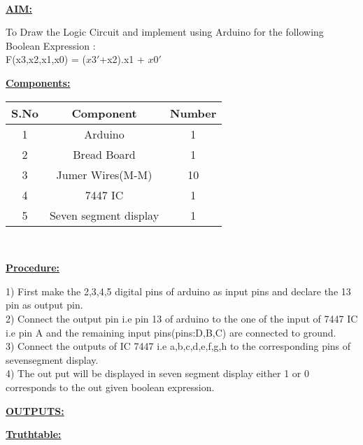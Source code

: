 \documentclass[10pt,a4paper,twocolumn]{report}
\begin{document}
\vspace{5mm}
\\ \raggedright \textbf{\underline{AIM:}}\vspace{2mm}
\\ \raggedright To Draw the Logic Circuit and implement using Arduino for the following Boolean Expression :
\\ F(x3,x2,x1,x0) = ($x3'$+x2).x1 + $x0'$
\vspace{5mm}
\\ \raggedright \textbf{\underline{Components:}}\vspace{2mm}
\begin{table}[ht]
\centering %
\begin{tabular}{c c c} %
\hline\hline %
S.No & Component & Number \\ [0.5ex] %
\hline
1 & Arduino & 1 \\
2 & Bread Board & 1 \\
3 & Jumer Wires(M-M) & 10 \\
4 & 7447 IC & 1 \\
5 & Seven segment display & 1 \\ [1ex] 
\hline
\end{tabular}
\end{table}
\vspace{5mm}
\\ \raggedright \textbf{\underline{Procedure:}}\vspace{4mm}
\\ \raggedright 1) First make the 2,3,4,5 digital pins of arduino as input pins and declare                            the 13 pin as output pin.
\\ 2) Connect the output pin i.e pin 13 of arduino to the one of the input of 7447 IC i.e pin A and the remaining input pins(pins:D,B,C) are connected to ground.
\\ 3) Connect the outputs of IC 7447 i.e a,b,c,d,e,f,g,h to the corresponding pins of sevensegment display.
\\ 4) The out put will be displayed in seven segment display either 1 or 0 corresponds to the out given boolean expression.
\vspace{10mm}
\\ \raggedright \textbf{\underline{OUTPUTS:}}\vspace{7mm}
\\ \raggedright \textbf{\underline{Truthtable:}}\vspace{2mm}
\end{document}
